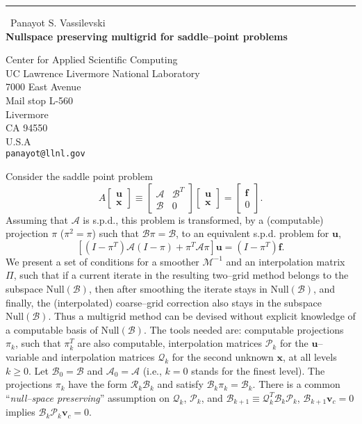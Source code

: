 \documentclass{report}
\begin{document}
\begin{center}
\rule{6in}{1pt} \
{\large Panayot S. Vassilevski \\
{\bf Nullspace preserving multigrid for saddle--point problems}}

Center for Applied Scientific Computing \\ UC Lawrence Livermore National Laboratory \\ 7000 East Avenue \\ Mail stop L-560 \\ Livermore \\ CA 94550 \\ U.S.A
\\
{\tt panayot@llnl.gov}\end{center}

Consider the saddle point problem
$$
A \left [
\begin{array}{c}
{\mathbf u}\\
{\mathbf x}
\end{array} \right ] \equiv
\left [
\begin{array}{cc}
{\mathcal A} & {\mathcal B}^T\\
{\mathcal B} & 0
\end{array} \right ] \left [
\begin{array}{c}
{\mathbf u}\\
{\mathbf x}
\end{array} \right ] = \left [
\begin{array}{c}
{\mathbf f}\\
0
\end{array} \right ].
$$
Assuming that ${\mathcal A}$ is s.p.d.,
this problem is transformed, by a (computable) projection $\pi$ ($\pi^2
= \pi$)
such that
${\mathcal B}\pi = {\mathcal B}$,
to an equivalent
s.p.d. problem for ${\mathbf u}$,
$$
\left [
(I-\pi^T){\mathcal A}(I-\pi) + \pi^T {\mathcal A} \pi \right ]
{\mathbf u} = (I-\pi^T){\mathbf f}.
$$
We present a set of conditions for a smoother
${\mathcal M}^{-1}$ and an interpolation matrix $\Pi$, such that
if a current iterate in the resulting two--grid method
belongs to the subspace $\text{Null}({\mathcal B})$,
then after smoothing
the iterate stays
in $\text{Null}({\mathcal B})$,
and finally,
the (interpolated) coarse--grid correction also stays in the subspace
$\text{Null}({\mathcal B})$.
Thus a multigrid method can be devised without
explicit knowledge of a computable basis
of $\text{Null}({\mathcal B})$.
The tools needed are: computable projections $\pi_k$, such that
$\pi^T_k$ are also
computable, interpolation matrices ${\mathcal P}_k$ for the
${\mathbf u}$--variable and interpolation matrices ${\mathcal Q}_k$ for
the
second unknown ${\mathbf x}$, at all levels $k \ge 0$.
Let ${\mathcal B}_0 = {\mathcal B}$ and
${\mathcal A}_0 = {\mathcal A}$ (i.e., $k=0$ stands for the finest
level).
The projections $\pi_k$ have the form ${\mathcal R}_k{\mathcal B}_k$
and
satisfy ${\mathcal B}_k \pi_k ={\mathcal B}_k$.
There is a common ``{\it null--space preserving}'' assumption on
${\mathcal Q}_k$, ${\mathcal P}_k$, and
${\mathcal B}_{k+1} \equiv {\mathcal Q}^T_k {\mathcal B}_k {\mathcal
P}_k$, ${\mathcal B}_{k+1} {\mathbf v}_c =0$
implies ${\mathcal B}_k {\mathcal P}_k {\mathbf v}_c = 0$.
\end{document}
